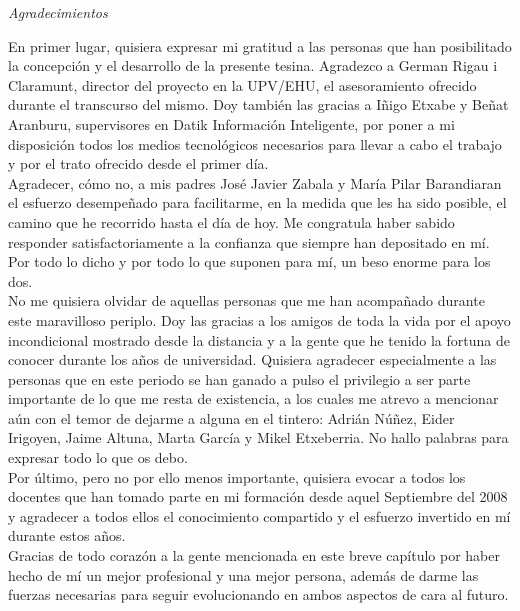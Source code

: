 \begin{flushright}
	\Large\textit{Agradecimientos}
\end{flushright}

En primer lugar, quisiera expresar mi gratitud a las personas que han posibilitado la concepción y el desarrollo de la presente tesina. Agradezco a German Rigau i Claramunt, director del proyecto en la UPV/EHU, el asesoramiento ofrecido durante el transcurso del mismo. Doy también las gracias a Iñigo Etxabe y Beñat Aranburu, supervisores en Datik Información Inteligente, por poner a mi disposición todos los medios tecnológicos necesarios para llevar a cabo el trabajo y por el trato ofrecido desde el primer día.\\

Agradecer, cómo no, a mis padres José Javier Zabala y María Pilar Barandiaran el esfuerzo desempeñado para facilitarme, en la medida que les ha sido posible, el camino que he recorrido hasta el día de hoy. Me congratula haber sabido responder satisfactoriamente a la confianza que siempre han depositado en mí. Por todo lo dicho y por todo lo que suponen para mí, un beso enorme para los dos.\\

No me quisiera olvidar de aquellas personas que me han acompañado durante este maravilloso periplo. Doy las gracias a los amigos de toda la vida por el apoyo incondicional mostrado desde la distancia y a la gente que he tenido la fortuna de conocer durante los años de universidad. Quisiera agradecer especialmente a las personas que en este periodo se han ganado a pulso el privilegio a ser parte importante de lo que me resta de existencia, a los cuales me atrevo a mencionar aún con el temor de dejarme a alguna en el tintero: Adrián Núñez, Eider Irigoyen, Jaime Altuna, Marta García y Mikel Etxeberria. No hallo palabras para expresar todo lo que os debo.\\

Por último, pero no por ello menos importante, quisiera evocar a todos los docentes que han tomado parte en mi formación desde aquel Septiembre del 2008 y agradecer a todos ellos el conocimiento compartido y el esfuerzo invertido en mí durante estos años.\\

Gracias de todo corazón a la gente mencionada en este breve capítulo por haber hecho de mí un mejor profesional y una mejor persona, además de darme las fuerzas necesarias para seguir evolucionando en ambos aspectos de cara al futuro.\\

